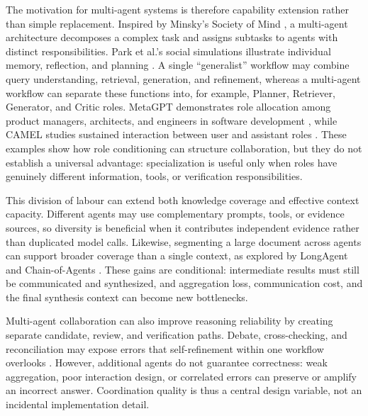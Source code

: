 \documentclass[a4paper,fleqn]{cas-dc}
\begin{document}
The motivation for multi-agent systems is therefore capability extension
rather than simple replacement. Inspired by Minsky's Society of Mind
\citep{minsky1988society}, a multi-agent architecture decomposes a complex
task and assigns subtasks to agents with distinct responsibilities. Park et al.'s
social simulations illustrate individual memory, reflection, and planning
\citep{park2023generative_agents}. A single ``generalist'' workflow may combine
query understanding, retrieval, generation, and refinement, whereas a
multi-agent workflow can separate these functions into, for example, Planner,
Retriever, Generator, and Critic roles. MetaGPT demonstrates role allocation
among product managers, architects, and engineers in software development
\citep{hong2024metagpt}, while CAMEL studies sustained interaction between
user and assistant roles \citep{li2023camel}. These examples show how role
conditioning can structure collaboration, but they do not establish a
universal advantage: specialization is useful only when roles have genuinely
different information, tools, or verification responsibilities.

This division of labour can extend both knowledge coverage and effective
context capacity. Different agents may use complementary prompts, tools, or
evidence sources, so diversity is beneficial when it contributes independent
evidence rather than duplicated model calls. Likewise, segmenting a large
document across agents can support broader coverage than a single context,
as explored by LongAgent and Chain-of-Agents
\citep{zhao2024longagent,zhang2024chain_agents}. These gains are conditional:
intermediate results must still be communicated and synthesized, and
aggregation loss, communication cost, and the final synthesis context can
become new bottlenecks.

Multi-agent collaboration can also improve reasoning reliability by creating
separate candidate, review, and verification paths. Debate, cross-checking,
and reconciliation may expose errors that self-refinement within one workflow
overlooks \citep{du2024multiagent_debate,chen2024reconcile,
xiong2023inter_consistency}. However, additional agents do not guarantee
correctness: weak aggregation, poor interaction design, or correlated errors
can preserve or amplify an incorrect answer. Coordination quality is thus a
central design variable, not an incidental implementation detail.



\end{document}
